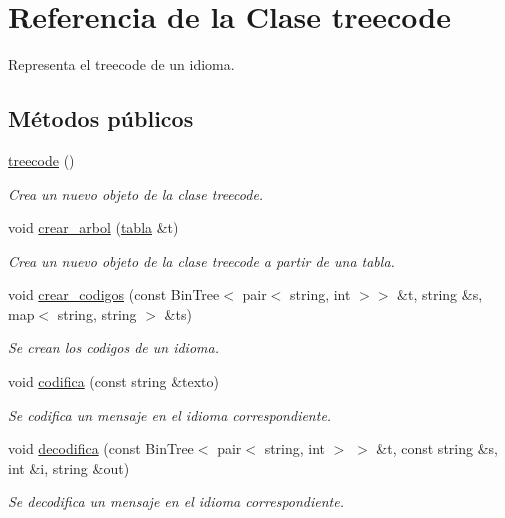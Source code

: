 \hypertarget{classtreecode}{}\section{Referencia de la Clase treecode}
\label{classtreecode}


Representa el treecode de un idioma.  


\subsection*{Métodos públicos}
\begin{DoxyCompactItemize}
\item 
\hyperlink{classtreecode_a221f560d05368b0fd98593cd42a15e33}{treecode} ()
\begin{DoxyCompactList}\small\item\em Crea un nuevo objeto de la clase treecode. \end{DoxyCompactList}\item 
void \hyperlink{classtreecode_af6bbdd5629014348d60cff563f843a50}{crear\+\_\+arbol} (\hyperlink{classtabla}{tabla} \&t)
\begin{DoxyCompactList}\small\item\em Crea un nuevo objeto de la clase treecode a partir de una tabla. \end{DoxyCompactList}\item 
void \hyperlink{classtreecode_a66ab40a4fb5fcf86837b708261b8831a}{crear\+\_\+codigos} (const Bin\+Tree$<$ pair$<$ string, int $>$$>$ \&t, string \&s, map$<$ string, string $>$ \&ts)
\begin{DoxyCompactList}\small\item\em Se crean los codigos de un idioma. \end{DoxyCompactList}\item 
void \hyperlink{classtreecode_a70aadac29b9785276ba4f1a4bca7515e}{codifica} (const string \&texto)
\begin{DoxyCompactList}\small\item\em Se codifica un mensaje en el idioma correspondiente. \end{DoxyCompactList}\item 
void \hyperlink{classtreecode_a446c078d3e137141bc56c6e44462322d}{decodifica} (const Bin\+Tree$<$ pair$<$ string, int $>$ $>$ \&t, const string \&s, int \&i, string \&out)
\begin{DoxyCompactList}\small\item\em Se decodifica un mensaje en el idioma correspondiente. \end{DoxyCompactList}\item 
$$
\end{DoxyCompactItemize}
